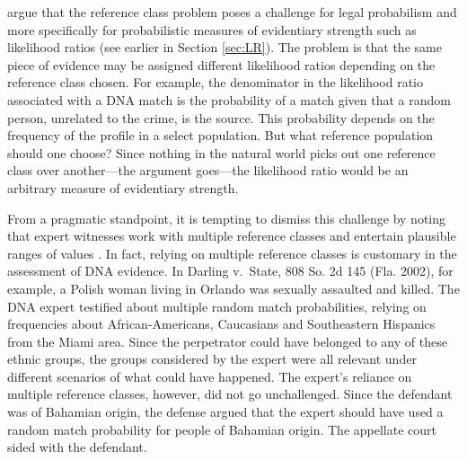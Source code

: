\documentclass{article}
\begin{document}
\citet{allen2007problematic} argue that the reference class problem poses a challenge for legal probabilism and more specifically for probabilistic measures of evidentiary strength such as likelihood ratios (see earlier in Section \ref{sec:LR}). The problem is that the same piece of evidence may be assigned different likelihood ratios depending on the reference class chosen. For example, the denominator in the likelihood ratio associated  with a DNA match  is the probability of a match given that a random person, unrelated to the crime, is the source. This probability depends on the frequency of the profile in a select population.  But what reference population should one choose?  Since nothing in the natural world picks out one reference class over another---the argument goes---the likelihood ratio would be an arbitrary measure of evidentiary strength. 
 


From a pragmatic standpoint, it is tempting to dismiss this challenge by noting 
that expert witnesses work with multiple reference classes and entertain plausible ranges of values \citep{nance2007}. 
In fact, relying on multiple reference classes is customary in the assessment of DNA evidence.
 In Darling v.\ State, 808 So. 2d 145 (Fla. 2002), for example, a Polish woman living in Orlando was sexually assaulted and killed. The DNA expert testified about multiple random match probabilities, relying on frequencies about African-Americans, Caucasians and Southeastern Hispanics from the Miami area. Since the perpetrator could have belonged to any of these ethnic groups, the groups considered by the expert were all relevant under different scenarios of what could have happened. 
  The expert's reliance on multiple reference classes, however, did not go unchallenged. Since the defendant was of Bahamian origin, the defense argued that the expert should have used a random match probability for people of Bahamian origin. The appellate court sided with the defendant. %
  
\end{document}
